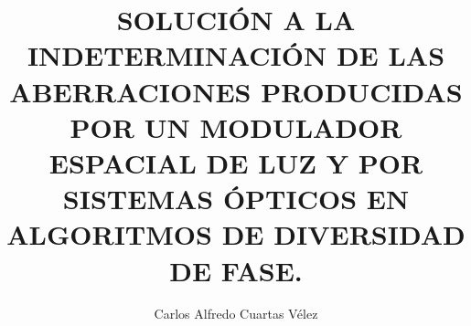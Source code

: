 \author{Carlos Alfredo Cuartas Vélez}
\title{SOLUCIÓN A LA INDETERMINACIÓN DE LAS ABERRACIONES PRODUCIDAS POR UN MODULADOR ESPACIAL DE LUZ Y POR SISTEMAS ÓPTICOS EN ALGORITMOS DE DIVERSIDAD DE FASE.}

\newcommand\portada{
	\begin{titlepage}
		\begin{center}
			\vfill
			{\Huge \bf TRABAJO DE GRADO}
			\vfill
			{\large \bf Carlos Alfredo Cuartas Vélez\\
			ccuarta1@eafit.edu.co \par}
			\vfill
			{\normalsize \bf Universidad EAFIT \par}
			{\normalsize \bf Escuela de Ciencias \par}
			{\normalsize \bf Departamento de Ciencias Físicas \par}
			{\normalsize \bf Ingeniería Física \par}
			{\normalsize \bf Medellín, Colombia \par}
			{\normalsize \bf 2015\par}
		\end{center}
	\end{titlepage}
}

\newcommand\contraportada{
	\begin{titlepage}
		\begin{center}
			{\large \bf SOLUCIÓN A LA INDETERMINACIÓN DE LAS ABERRACIONES PRODUCIDAS POR UN MODULADOR ESPACIAL DE LUZ Y POR SISTEMAS ÓPTICOS EN ALGORITMOS DE DIVERSIDAD DE FASE} 
			\vfill
			{\large \bf CARLOS ALFREDO CUARTAS VÉLEZ} %
			\vfill
			{\large Tesis de grado presentada como requisito parcial para optar al título de: \\ 
			\bf Ingeniero Físico\par}
			\vfill
			{\large\bf Director \par} 
                        {\large\bf PROF. RENÉ RESTREPO GÓMEZ \par}
                        
			\vfill
			{\normalsize \bf UNIVERSIDAD EAFIT \par}
			{\normalsize \bf ESCUELA DE CIENCIAS \par}
			{\normalsize \bf DEPARTAMENTO DE CIENCIAS FÍSICAS \par}
			{\normalsize \bf INGENIERÍA FÍSICA \par}
			{\normalsize \bf MEDELLÍN, COLOMBIA \par}
			{\normalsize \bf 2015\par}
		\end{center}
\end{titlepage}
}

